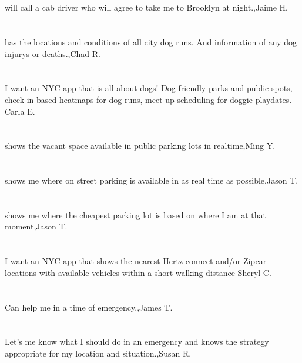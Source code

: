 \section{}will call a cab driver who will agree to take me to Brooklyn at night.,Jaime H.	
\section{}has the locations and conditions of all city dog runs. And information of any dog injurys  or deaths.,Chad R.	 
\section{}I want an NYC app that is all about dogs! Dog-friendly parks and public spots, check-in-based heatmaps for dog runs, meet-up scheduling for doggie playdates.  Carla E.	
\section{} shows the vacant  space available in public parking lots in realtime,Ming Y.	
\section{}shows me where on street parking is available in as real time as possible,Jason  T.	
\section{}shows me where the cheapest parking lot is based on where I am at that moment,Jason  T.	
\section{}I want an NYC app that shows the nearest Hertz connect and/or Zipcar locations with available vehicles within a short walking distance   Sheryl C.	
\section{} Can help me in a time of emergency.,James T.	
\section{} Let's me know what I should do in an emergency and knows the strategy appropriate for my location and situation.,Susan R.	
